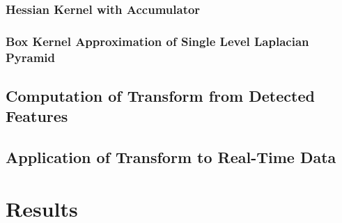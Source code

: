 \documentclass{article}
\begin{document}
\subsubsection{Hessian Kernel with Accumulator}

\subsubsection{Box Kernel Approximation of Single Level Laplacian Pyramid}

\subsection{Computation of Transform from Detected Features}

\subsection{Application of Transform to Real-Time Data}

\section{Results}

\pagebreak



\end{document}
